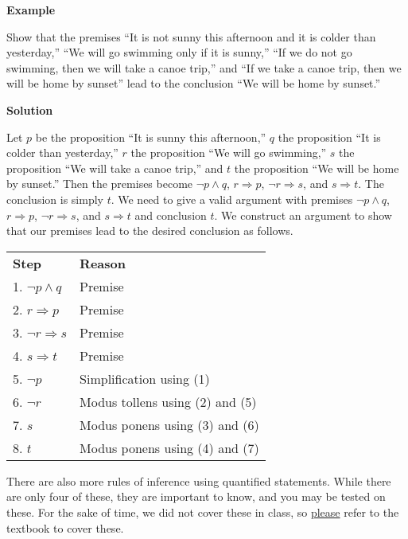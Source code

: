 \documentclass{article}
\begin{document}
    \vspace{1.5mm}
    \textbf{Example}

    Show that the premises ``It is not sunny this afternoon and it is colder than yesterday,” ``We will go swimming only if it is sunny,” ``If we do not go swimming, then we will take a canoe trip,” and ``If we take a canoe trip, then we will be home by sunset” lead to the conclusion ``We will be home by sunset.”

    \vspace{1.5mm}
    \textbf{Solution}
    
   Let $p$ be the proposition ``It is sunny this afternoon,” $q$ the proposition ``It is colder than yesterday,” $r$ the proposition ``We will go swimming,” $s$ the proposition ``We will take a canoe trip,” and $t$ the proposition ``We will be home by sunset.” Then the premises become $\neg p \land q$, $r \Rightarrow p$, $\neg r \Rightarrow s$, and $s \Rightarrow t$. The conclusion is simply $t$. We need to give a valid argument with premises $\neg p \land q$, $r \Rightarrow p$, $\neg r \Rightarrow s$, and $s \Rightarrow t$ and conclusion $t$. We construct an argument to show that our premises lead to the desired conclusion as follows.

    \begin{center}
        \begin{tabular}{ll}
            \textbf{Step} & \textbf{Reason} \\
            1. $\neg p \land q$ & Premise \\
            2. $r \Rightarrow p$ & Premise \\
            3. $\neg r \Rightarrow s$ & Premise \\
            4. $s \Rightarrow t$ & Premise \\
            5. $\neg p$ & Simplification using (1) \\
            6. $\neg r$ & Modus tollens using (2) and (5) \\
            7. $s$ & Modus ponens using (3) and (6) \\
            8. $t$ & Modus ponens using (4) and (7)
        \end{tabular}
    \end{center}
    
    There are also more rules of inference using quantified statements. While there are only four of these, they are important to know, and you may be tested on these. For the sake of time, we did not cover these in class, so \underline{please} refer to the textbook to cover these.
\end{document}
